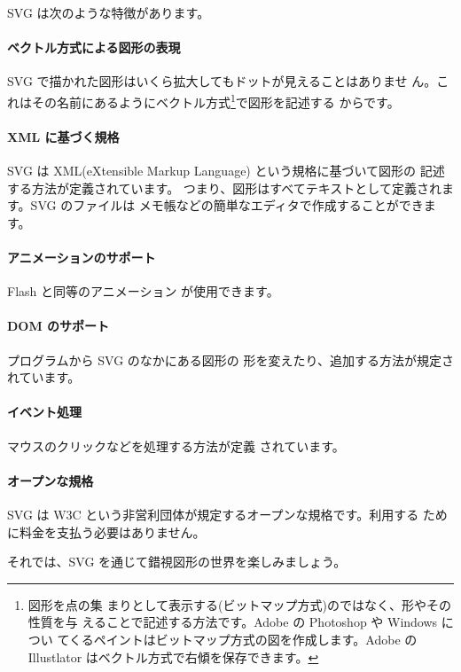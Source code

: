 
SVG は次のような特徴があります。

\paragraph{ベクトル方式による図形の表現}
       SVG で描かれた図形はいくら拡大してもドットが見えることはありませ
       ん。これはその名前にあるようにベクトル方式\footnote{図形を点の集
       まりとして表示する(ビットマップ方式)のではなく、形やその性質を与
       えることで記述する方法です。Adobe の Photoshop や Windows につい
       てくるペイントはビットマップ方式の図を作成します。Adobe の
       Illustlator はベクトル方式で右傾を保存できます。}で図形を記述する
       からです。
 \paragraph{XML に基づく規格}
       SVG は XML(eXtensible Markup Language) という規格に基づいて図形の
       記述する方法が定義されています。
       つまり、図形はすべてテキストとして定義されます。SVG のファイルは
       メモ帳などの簡単なエディタで作成することができます。
 \paragraph{アニメーションのサポート}Flash と同等のアニメーション
       が使用できます。
 \paragraph{DOM のサポート}プログラムから SVG のなかにある図形の
       形を変えたり、追加する方法が規定されています。
 \paragraph{イベント処理}マウスのクリックなどを処理する方法が定義
       されています。
 \paragraph{オープンな規格}
       SVG は W3C という非営利団体が規定するオープンな規格です。利用する
       ために料金を支払う必要はありません。
\fi

それでは、SVG を通じて錯視図形の世界を楽しみましょう。
\renewcommand{\thefigure}{\thechapter.\arabic{figure}}
